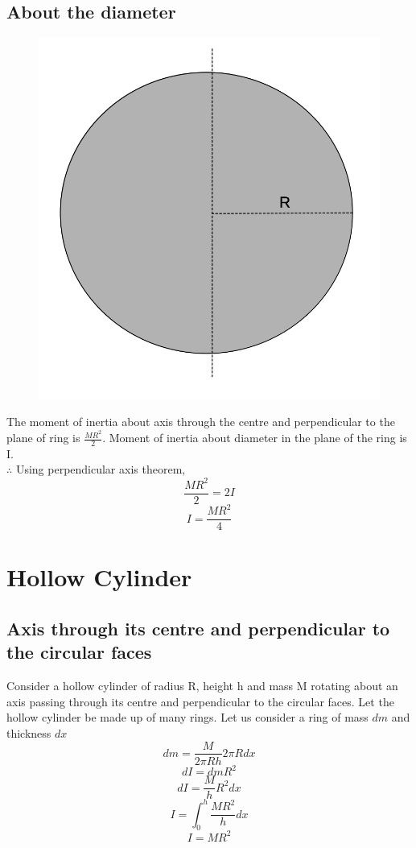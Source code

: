 \documentclass{article}
\begin{document}
\subsection{About the diameter}
\begin{figure}[h!]
  \centering
  \includegraphics[scale=0.3]{disk2.png}
\end{figure}
The moment of inertia about axis through the centre and perpendicular to the plane of ring is $\frac{MR^2}{2}$. Moment of inertia about diameter in the plane of the ring is I.\\
$\therefore$ Using perpendicular axis theorem,
$$\frac{MR^2}{2} = 2I$$
$$\boxed{I = \frac{MR^2}{4}}$$

\section{Hollow Cylinder}
\subsection{Axis through its centre and perpendicular to the circular faces}
Consider a hollow cylinder of radius R, height h and mass M rotating about an axis passing through its centre and perpendicular to the circular faces. Let the hollow cylinder be made up of many rings.
Let us consider a ring of mass $dm$ and thickness $dx$
$$dm = \frac{M}{2\pi Rh}2\pi R dx$$
$$dI = dm R^2$$
$$dI = \frac{M}{h} R^2 dx$$
$$I = \int_0^h \frac{MR^2}{h} dx$$
$$\boxed{I = MR^2}$$
\end{document}
